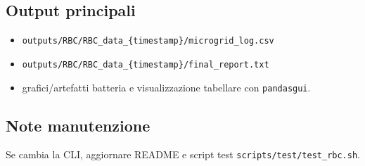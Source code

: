 \subsection*{Output principali}
\begin{itemize}[leftmargin=1.2cm]
\item \texttt{outputs/RBC/RBC\_data\_\{timestamp\}/microgrid\_log.csv}
\item \texttt{outputs/RBC/RBC\_data\_\{timestamp\}/final\_report.txt}
\item grafici/artefatti batteria e visualizzazione tabellare con \texttt{pandasgui}.
\end{itemize}

\subsection*{Note manutenzione}
Se cambia la CLI, aggiornare README e script test \texttt{scripts/test/test\_rbc.sh}.
